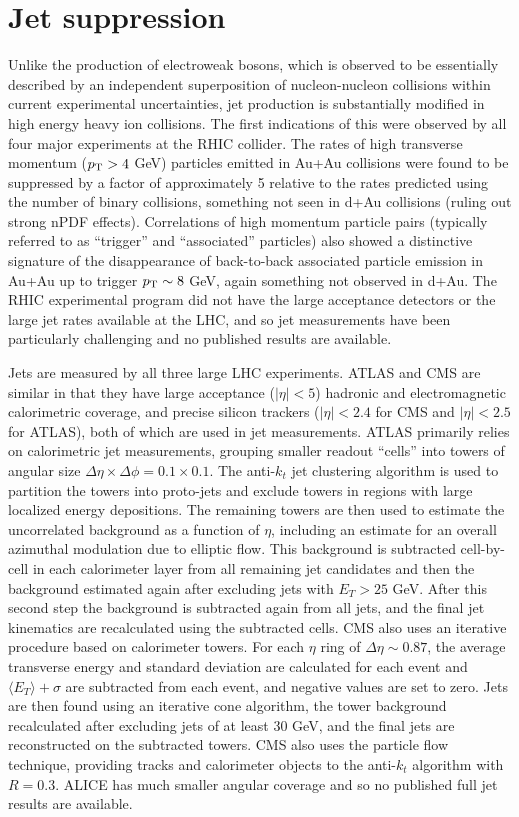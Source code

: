 \section{Jet suppression}
\label{jets}
Unlike the production of electroweak bosons, which is observed to be essentially described by
an independent superposition of nucleon-nucleon collisions within current experimental uncertainties,
jet production is substantially modified in high energy heavy ion collisions.
The first indications of this were observed by all four major experiments at the RHIC collider.
The rates of high transverse momentum ($\mbox{$p_{\mathrm{T}}$}>4$ GeV) particles emitted in Au+Au collisions
were found to be suppressed
by a factor of approximately 5 relative to the rates predicted using the number of binary
collisions, something not seen in d+Au collisions (ruling out strong nPDF effects).
Correlations of high momentum particle pairs (typically referred to as ``trigger'' and ``associated''
particles) also showed a distinctive signature of the disappearance
of back-to-back associated particle emission in Au+Au up to trigger $\mbox{$p_{\mathrm{T}}$} \sim 8$ GeV, 
again something not observed in d+Au.
The RHIC experimental program did not have the large acceptance detectors or the large jet rates 
available at the LHC, and so jet measurements have been particularly challenging and no 
published results are available.

Jets are measured by all three large LHC experiments.  ATLAS and CMS are similar in that they
have large acceptance ($|\eta|<5$) hadronic and electromagnetic calorimetric coverage, and 
precise silicon trackers ($|\eta|<2.4$ for CMS and $|\eta|<2.5$ for ATLAS), 
both of which are used in jet measurements.
ATLAS primarily relies on calorimetric jet measurements, grouping smaller readout ``cells''
into towers of angular size $\Delta \eta \times \Delta \phi = 0.1 \times 0.1$. 
The anti-$k_t$ jet clustering algorithm is used to partition the towers into proto-jets
and exclude towers in regions with large localized energy depositions.  The remaining towers
are then used to estimate the uncorrelated background as a function of $\eta$, including
an estimate for an overall azimuthal modulation due to elliptic flow.  This background is subtracted
cell-by-cell in each calorimeter 
layer from all remaining jet candidates and then the background estimated again after excluding
jets with $E_T>25$ GeV.  After this second step the background is subtracted again from all
jets, and the final jet kinematics are recalculated using the subtracted cells.
CMS also uses an iterative procedure based on calorimeter towers.  For each $\eta$ ring
of $\Delta \eta \sim 0.87$, the average transverse energy and standard deviation are calculated
for each event and $\langle E_T \rangle + \sigma$ are subtracted from each event, and negative
values are set to zero.  Jets are then found using an iterative cone algorithm, the tower background
recalculated after excluding jets of at least 30 GeV, and the final jets are reconstructed 
on the subtracted towers.
CMS also uses the particle flow technique, providing tracks and calorimeter objects to the 
anti-$k_t$ algorithm with $R=0.3$.
ALICE has much smaller angular coverage and so no published full jet results are available.

